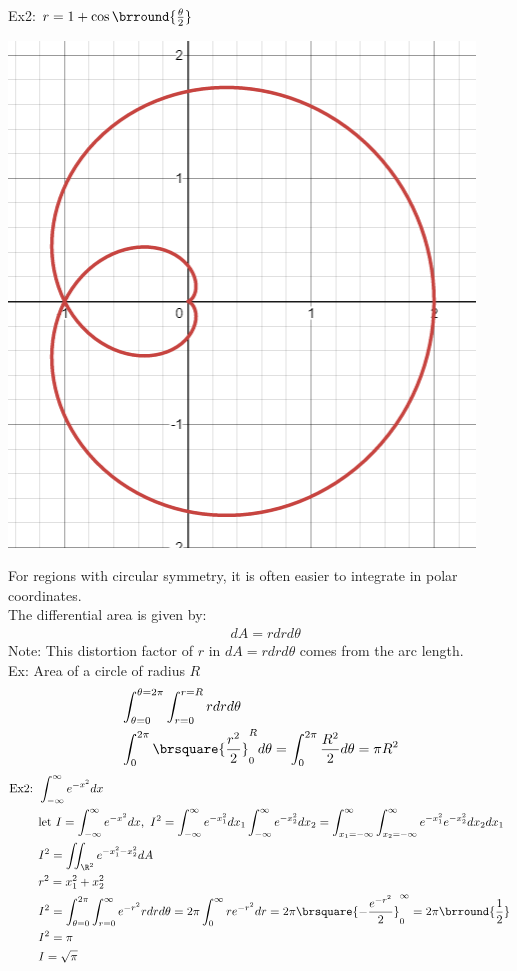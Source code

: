 Ex2: $r=1+\cos\brround{\frac{\theta}{2}}$\\
\centerline{\includegraphics[scale=0.7]{Images/PreCalcPictures/PolarGraph2.png}}

For regions with circular symmetry, it is often easier to integrate in polar coordinates.\\
The differential area is given by:
\begin{align*}
    &dA=rdrd\theta
\end{align*}
Note: This distortion factor of $r$ in $dA=rdrd\theta$ comes from the arc length.\\
Ex: Area of a circle of radius $R$
\begin{align*}
    &\int_{\theta=0}^{\theta=2\pi}\int_{r=0}^{r=R}rdrd\theta\\
    &\int_0^{2\pi}\brsquare{\frac{r^2}{2}}_0^Rd\theta=\int_0^{2\pi}\frac{R^2}{2}d\theta=\pi R^2
\end{align*}
\begin{align*}
    \text{Ex2: }&\int_{-\infty}^\infty e^{-x^2}dx\\
    &\text{let }I=\int_{-\infty}^\infty e^{-x^2}dx,\ I^2=\int_{-\infty}^\infty e^{-x_1^2}dx_1\int_{-\infty}^\infty e^{-x_2^2}dx_2=\int_{x_1=-\infty}^\infty\int_{x_2=-\infty}^\infty e^{-x_1^2}e^{-x_2^2}dx_2dx_1\\
    &I^2=\iint_{\R^2}e^{-x_1^2-x_2^2}dA\\
    &r^2=x_1^2+x_2^2\\
    &I^2=\int_{\theta=0}^{2\pi}\int_{r=0}^\infty e^{-r^2}rdrd\theta=2\pi\int_0^\infty re^{-r^2}dr=2\pi\brsquare{-\frac{e^{-r^2}}{2}}_0^\infty=2\pi\brround{\frac{1}{2}}\\
    &I^2=\pi\\
    &I=\sqrt{\pi}
    \end{align*}
